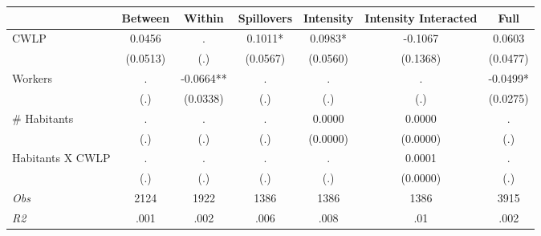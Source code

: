 \begin{tabular}{l*{6}{c}}\hline&\multicolumn{1}{c}{Between}&\multicolumn{1}{c}{Within}&\multicolumn{1}{c}{Spillovers}&\multicolumn{1}{c}{Intensity}&\multicolumn{1}{c}{Intensity Interacted}&\multicolumn{1}{c}{Full}\\ \hline 
CWLP & 0.0456 & . & 0.1011* & 0.0983* & -0.1067 & 0.0603 \\
 & (0.0513) & (.) & (0.0567) & (0.0560) & (0.1368) & (0.0477) \\
Workers & . & -0.0664** & . & . & . & -0.0499* \\
 & (.) & (0.0338) & (.) & (.) & (.) & (0.0275) \\
\# Habitants & . & . & . & 0.0000 & 0.0000 & . \\
 & (.) & (.) & (.) & (0.0000) & (0.0000) & (.) \\
Habitants X CWLP & . & . & . & . & 0.0001 & . \\
 & (.) & (.) & (.) & (.) & (0.0000) & (.) \\
\hline \textit{Obs} & 2124 & 1922 & 1386 & 1386 & 1386 & 3915 \\ \textit{R2} & .001 & .002 & .006 & .008 & .01 & .002 \\ \hline \end{tabular}
